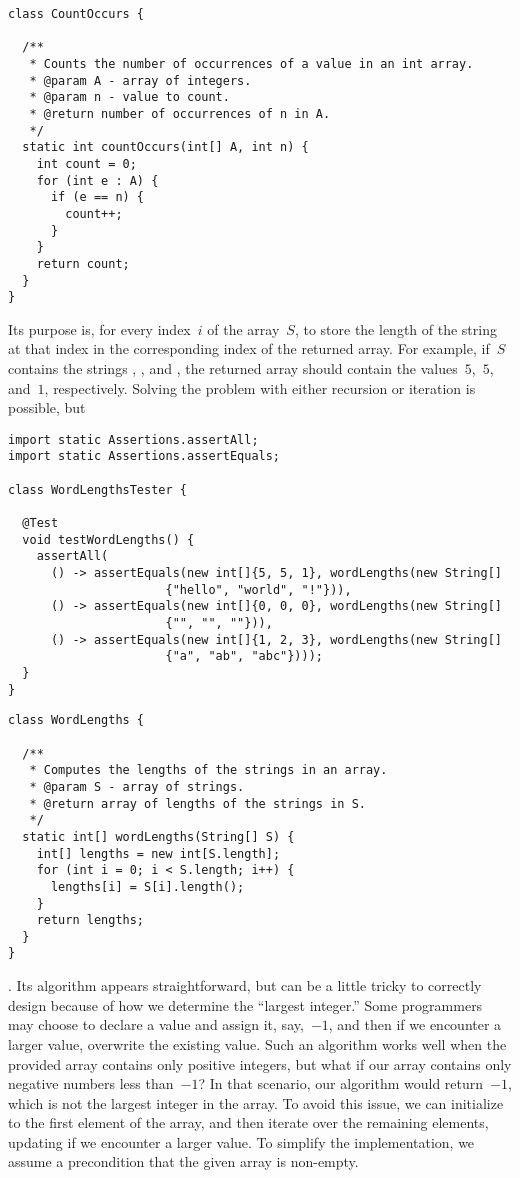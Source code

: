 \begin{lstlisting}[language=MyJava]
class CountOccurs {

  /** 
   * Counts the number of occurrences of a value in an int array.
   * @param A - array of integers.
   * @param n - value to count.
   * @return number of occurrences of n in A.
   */
  static int countOccurs(int[] A, int n) {
    int count = 0;
    for (int e : A) {
      if (e == n) { 
        count++; 
      }
    }
    return count;
  }
}
\end{lstlisting}

Its purpose is, for every index~$i$ of the array~$S$, to store the length of the string at that index in the corresponding index of the returned array.
For example, if~$S$ contains the strings , , and , the returned array should contain the values~$5$,~$5$, and~$1$, respectively.
Solving the problem with either recursion or iteration is possible, but

\begin{lstlisting}[language=MyJava]
import static Assertions.assertAll;
import static Assertions.assertEquals;

class WordLengthsTester {

  @Test
  void testWordLengths() {
    assertAll(
      () -> assertEquals(new int[]{5, 5, 1}, wordLengths(new String[]
                      {"hello", "world", "!"})),
      () -> assertEquals(new int[]{0, 0, 0}, wordLengths(new String[]
                      {"", "", ""})),
      () -> assertEquals(new int[]{1, 2, 3}, wordLengths(new String[]
                      {"a", "ab", "abc"})));
  }
}
\end{lstlisting}

\begin{lstlisting}[language=MyJava]
class WordLengths {

  /**
   * Computes the lengths of the strings in an array.
   * @param S - array of strings.
   * @return array of lengths of the strings in S.
   */
  static int[] wordLengths(String[] S) {
    int[] lengths = new int[S.length];
    for (int i = 0; i < S.length; i++) {
      lengths[i] = S[i].length();
    }
    return lengths;
  }
}
\end{lstlisting}

. Its algorithm appears straightforward, but can be a little tricky to correctly design because of how we determine the ``largest integer.'' 
Some programmers may choose to declare a value  and assign it, say,~$-1$, and then if we encounter a larger value, overwrite the existing value. 
Such an algorithm works well when the provided array contains only positive integers, but what if our array contains only negative numbers less than~$-1$? 
In that scenario, our algorithm would return~$-1$, which is not the largest integer in the array. 
To avoid this issue, we can initialize  to the first element of the array, and then iterate over the remaining elements, updating  if we encounter a larger value.
To simplify the implementation, we assume a precondition that the given array is non-empty.

